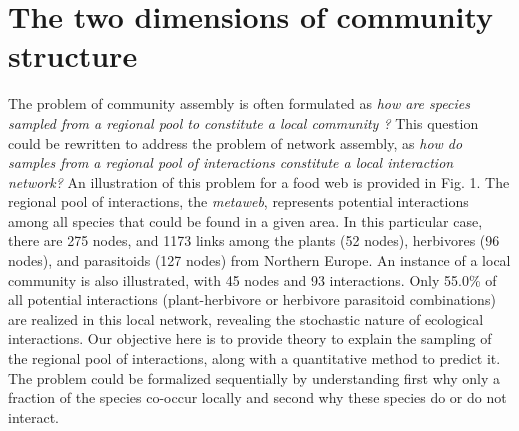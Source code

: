 \documentclass[12pt]{article}
\begin{document}
\section*{The two dimensions of community structure}

The problem of community assembly is often formulated as \textit{how are
species sampled from a regional pool to constitute a local community
\citep{Gotzenberger2012}?} This question could be rewritten to address the
problem of network assembly, as \textit{how do samples from a regional pool of
interactions constitute a local interaction network?} An illustration of this
problem for a food web is provided in Fig. 1. The regional pool of
interactions, the \emph{metaweb}, represents potential interactions among all
species that could be found in a given area. In this particular case, there
are 275 nodes, and 1173 links among the plants (52 nodes), herbivores (96
nodes), and parasitoids (127 nodes) from Northern Europe. An instance of a
local community is also illustrated, with 45 nodes and 93 interactions. Only
55.0\% of all potential interactions (plant-herbivore or herbivore parasitoid
combinations) are realized in this local network, revealing the stochastic
nature of ecological interactions. Our objective here is to provide theory to
explain the sampling of the regional pool of interactions, along with a
quantitative method to predict it. The problem could be formalized
sequentially by understanding first why only a fraction of the species co-occur locally and second why these species do or do not interact.
\end{document}
